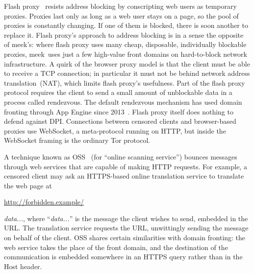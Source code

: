 \documentclass[conference]{IEEEtran}
\def\meek{meek}
\def\urll#1{\begin{NoHyper}\url{#1}\end{NoHyper}}
\begin{document}
Flash proxy~\cite{flashproxy} resists address blocking by
conscripting web users as temporary proxies. Proxies last only as long as a web
user stays on a page, so the pool of proxies is constantly changing.
If one of them is blocked, there is soon another to replace it.
Flash proxy's approach to address blocking is in a sense
the opposite of \meek's:
where flash proxy uses many cheap, disposable, individually blockable proxies,
\meek\ uses just a few high-value front domains on hard-to-block network infrastructure.
A quirk of the browser proxy model is that
the client must be able to receive a TCP connection; in particular it
must not be behind network address translation~(NAT), which limits flash proxy's usefulness.
Part of the flash proxy protocol requires the client to send
a small amount of unblockable data in a process called rendezvous.
The default rendezvous mechanism has used domain fronting through App Engine since 2013~\cite{flashproxy-reg-appspot}.
Flash proxy itself does nothing to defend against DPI.
Connections between censored clients and browser-based proxies use
WebSocket, a meta-protocol running on HTTP,
but inside the WebSocket framing is the ordinary Tor protocol.

A technique known as OSS~\cite{oss} (for
``online scanning service'') bounces messages
through web services that are capable of making HTTP requests.
For example, a censored client may ask an HTTPS-based online translation service to
translate the web page at \urll{http://forbidden.example/}\textsl{data...},
where ``\textsl{data...}'' is the message the client wishes to send,
embedded in the URL.
The translation service requests the URL,
unwittingly sending the message on behalf of the client.
OSS shares certain similarities with domain fronting:
the web service takes the place of the front domain,
and the destination of the communication is embedded somewhere in an HTTPS query
rather than in the Host header.
\end{document}
